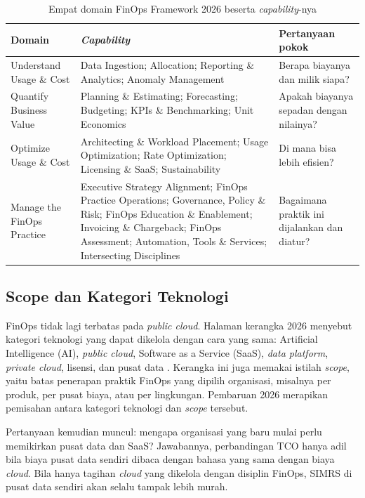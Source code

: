 \begin{table}[!htb]
  \centering
  \caption{Empat domain FinOps Framework 2026 beserta \textit{capability}-nya}
  \label{tab:ch03-domain-finops}
  \footnotesize
  \begin{tabularx}{\textwidth}{>{\raggedright\arraybackslash}p{3.0cm} >{\raggedright\arraybackslash}X >{\raggedright\arraybackslash}p{3.2cm}}
    \hline
    \textbf{Domain} & \textbf{\textit{Capability}} & \textbf{Pertanyaan pokok} \\ \hline
    Understand Usage \& Cost & Data Ingestion; Allocation; Reporting \& Analytics; Anomaly
      Management & Berapa biayanya dan milik siapa? \\ \hline
    Quantify Business Value & Planning \& Estimating; Forecasting; Budgeting; KPIs \& Benchmarking;
      Unit Economics & Apakah biayanya sepadan dengan nilainya? \\ \hline
    Optimize Usage \& Cost & Architecting \& Workload Placement; Usage Optimization; Rate
      Optimization; Licensing \& SaaS; Sustainability & Di mana bisa lebih efisien? \\ \hline
    Manage the FinOps Practice & Executive Strategy Alignment; FinOps Practice Operations;
      Governance, Policy \& Risk; FinOps Education \& Enablement; Invoicing \& Chargeback; FinOps
      Assessment; Automation, Tools \& Services; Intersecting Disciplines & Bagaimana praktik ini
      dijalankan dan diatur? \\ \hline
  \end{tabularx}
\end{table}

\subsection{Scope dan Kategori Teknologi}

FinOps tidak lagi terbatas pada \textit{public cloud}. Halaman kerangka 2026 menyebut kategori
teknologi yang dapat dikelola dengan cara yang sama: Artificial Intelligence (AI), \textit{public
cloud}, Software as a Service (SaaS), \textit{data platform}, \textit{private cloud}, lisensi, dan
pusat data \cite{finops2026}. Kerangka ini juga memakai istilah \textit{scope}, yaitu batas
penerapan praktik FinOps yang dipilih organisasi, misalnya per produk, per pusat biaya, atau per
lingkungan. Pembaruan 2026 merapikan pemisahan antara kategori teknologi dan \textit{scope}
tersebut.

Pertanyaan kemudian muncul: mengapa organisasi yang baru mulai perlu memikirkan pusat data dan SaaS?
Jawabannya, perbandingan TCO hanya adil bila biaya pusat data sendiri dibaca dengan bahasa yang sama
dengan biaya \textit{cloud}. Bila hanya tagihan \textit{cloud} yang dikelola dengan disiplin FinOps,
SIMRS di pusat data sendiri akan selalu tampak lebih murah.

